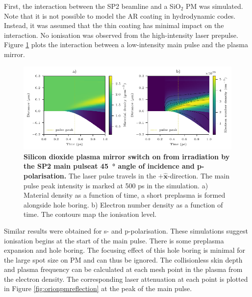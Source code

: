 First, the interaction between the SP2 beamline and a SiO$_2$ PM was simulated. Note that it is not possible to model the AR coating in hydrodynamic codes. Instead, it was assumed that the thin coating has minimal impact on the interaction. No ionisation was observed from the high-intensity laser prepulse. Figure \ref{fig:orionpmirradiation} plots the interaction between a low-intensity main pulse and the plasma mirror. 
\begin{figure}
	\centering
	\includegraphics{figures/orion/orion_PM_irradiation}
	\caption[Silicon dioxide plasma mirror switch on from irradiation by the SP2 main pulse.]{\textbf{Silicon dioxide plasma mirror switch on from irradiation by the SP2 main pulseat \qty{45}{\degree} angle of incidence and p-polarisation.} The laser pulse travels in the $+\mathbf{\hat{x}}$-direction. The main pulse peak intensity is marked at 500 ps in the simulation. a) Material density as a function of time, a short preplasma is formed alongside hole boring. b) Electron number density as a function of time. The contours map the ionisation level.}
	\label{fig:orionpmirradiation}
\end{figure}
Similar results were obtained for s- and p-polarisation. These simulations suggest ionisation begins at the start of the main pulse. There is some preplasma expansion and hole boring. The focusing effect of this hole boring is minimal for the large spot size on PM and can thus be ignored. The collisionless skin depth and plasma frequency can be calculated at each mesh point in the plasma from the electron density. The corresponding laser attenuation at each point is plotted in Figure \ref{fig:orionpmreflection} at the peak of the main pulse.
